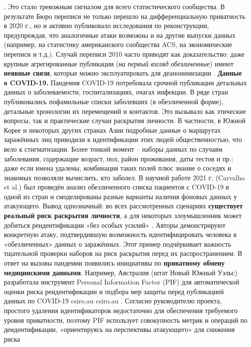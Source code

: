 \autocite{blog-seas-upenn-edu}
. Это стало тревожным сигналом для всего статистического сообщества. В результате Бюро переписи не только перешло на дифференциальную приватность в 2020 г., но и активно публиковало исследования по реконструкции, предупреждая, что аналогичные атаки возможны и на другие выпуски данных (например, на статистику американского сообщества ACS, на экономические переписи и т.д.). Случай переписи 2010 часто приводят как доказательство: даже крупные агрегированные публикации (\textit{на первый взгляд обезличенные}) имеют \textbf{неявные связи}, которые можно эксплуатировать для деанонимизации
\autocite{blog-seas-upenn-edu}
. \textbf{Данные о COVID-19.} Пандемия COVID-19 потребовала срочной публикации детальных данных о заболеваемости, госпитализациях, очагах инфекции. В ряде стран публиковались пофамильные списки заболевших (в обезличенной форме), детальные хронологии их перемещений и контактов. Это вызывало как этические вопросы, так и практические случаи раскрытия личности. В частности, в Южной Корее и некоторых других странах Азии подробные данные о маршрутах заражённых лиц приводили к идентификации этих людей общественностью, что вело к стигматизации. Более тонкий момент – наборы данных по случаям заболевания, содержащие возраст, пол, район проживания, даты тестов и пр.: даже если имена удалены, комбинация таких полей плюс знание о соседях и знакомых позволяли вычислить, кто заболел. В научной работе 2021 г. (Carvalho et al.) был проведён анализ обезличенного списка пациентов с COVID-19 в одной из стран и смоделированы разные варианты наличия фоновых данных у атакующего. Вывод однозначный: во всех рассмотренных сценариях \textbf{существует реальный риск раскрытия личности}, а для некоторых злоумышленник может добиться реидентификации «без особых усилий»
\autocite{journals-plos-org}
. Авторы демонстрируют конкретную атаку, подтвердившую возможность идентифицировать человека в «обезличенных» данных о заражённых. Этот пример подчёркивает важность тщательной проверки наборов на риск раскрытия перед их распространением. В ответ на вызовы пандемии появились инициативы по \textbf{приватному обмену медицинскими данными}. Например, Австралия (штат Новый Южный Уэльс) разработала инструмент Personal Information Factor (PIF) для автоматической оценки риска реидентификации и подбора мер защиты перед публикацией данных по COVID-19
csiro.au
csiro.au
. Согласно руководителю проекта, простого удаления идентификаторов недостаточно для обеспечения требуемого уровня приватности, поэтому PIF использует совокупность метрик и операций по деидентификации, «ориентируясь на перспективы атакующего» для снижения риска
